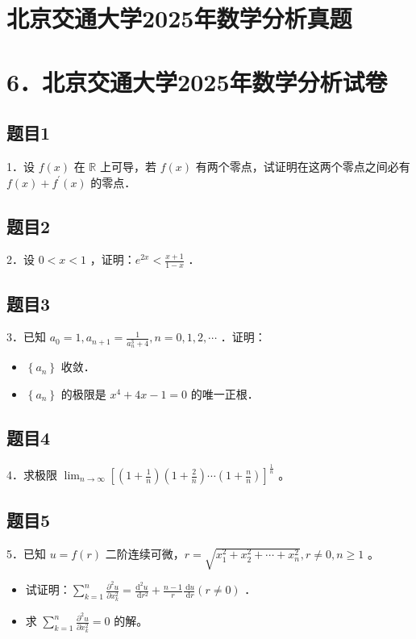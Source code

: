 \documentclass{article}
\begin{document}
\section*{北京交通大学2025年数学分析真题}
\section*{6．北京交通大学2025年数学分析试卷}

\subsection{题目1}
1．设 \(f(x)\) 在 \(\mathbb{R}\) 上可导，若 \(f(x)\) 有两个零点，试证明在这两个零点之间必有 \(f(x)+f^{\prime}(x)\) 的零点．

\subsection{题目2}
2．设 \(0<x<1\) ，证明：\(e^{2 x}<\frac{x+1}{1-x}\) ．

\subsection{题目3}
3．已知 \(a_{0}=1, a_{n+1}=\frac{1}{a_{n}^{3}+4}, n=0,1,2, \cdots\) ．证明：

\begin{itemize}
  \item[（1）] \(\left\{a_{n}\right\}\) 收敛．
  \item[（2）] \(\left\{a_{n}\right\}\) 的极限是 \(x^{4}+4 x-1=0\) 的唯一正根．
\end{itemize}

\subsection{题目4}
4．求极限 \(\lim _{n \rightarrow \infty}\left[\left(1+\frac{1}{n}\right)\left(1+\frac{2}{n}\right) \cdots\left(1+\frac{n}{n}\right)\right]^{\frac{1}{n}}\) 。

\subsection{题目5}
5．已知 \(u=f(r)\) 二阶连续可微，\(r=\sqrt{x_{1}^{2}+x_{2}^{2}+\cdots+x_{n}^{2}}, r \neq 0, n \geq 1\) 。

\begin{itemize}
  \item[（1）] 试证明：\(\sum_{k=1}^{n} \frac{\partial^{2} u}{\partial x_{k}^{2}}=\frac{\mathrm{d}^{2} u}{\mathrm{~d} r^{2}}+\frac{n-1}{r} \frac{\mathrm{~d} u}{\mathrm{~d} r}(r \neq 0)\) ．
  \item[（2）] 求 \(\sum_{k=1}^{n} \frac{\partial^{2} u}{\partial x_{k}^{2}}=0\) 的解。
\end{itemize}
\end{document}
